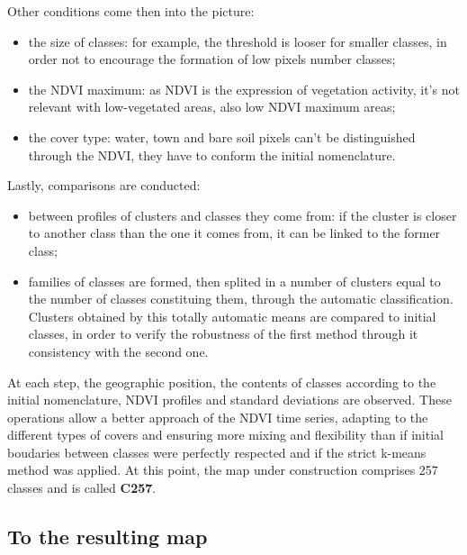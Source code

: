 Other conditions come then into the picture:
\begin{itemize}  
\item{the size of classes: for example, the threshold is looser for smaller classes, in order not to encourage the formation of low pixels 
number classes;}
\item{the NDVI maximum: as NDVI is the expression of vegetation activity, it's not relevant with low-vegetated areas, also low NDVI maximum 
areas;}
\item{the cover type: water, town and bare soil pixels can't be distinguished through the NDVI, they have to conform the initial nomenclature.}
\end{itemize}
Lastly, comparisons are conducted:
\begin{itemize}
\item{between profiles of clusters and classes they come from: if the cluster is closer to another class than the one it comes from, it can be 
linked to the former class;}
\item{families of classes are formed, then splited in a number of clusters equal to the number of classes constituing them, through the 
automatic classification. Clusters obtained by this totally automatic means are compared to initial classes, in order to verify 
the robustness of the first method through it consistency with the second one. }
\end{itemize}
At each step, the geographic position, the contents of classes according to the initial nomenclature, NDVI profiles and standard deviations 
are observed. These operations allow a better approach of the NDVI time series, adapting to the different types of covers and ensuring more mixing and flexibility than if initial 
boudaries between classes were perfectly respected and if the strict k-means method was applied. 
At this point, the map under construction comprises 257 classes and is called \textbf{C257}. 

\subsection{To the resulting map}\label{end_map}

